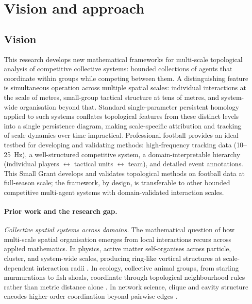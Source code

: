 \section{Vision and approach}

\subsection{Vision}

This research develops new mathematical frameworks for multi-scale topological analysis of competitive collective systems: bounded collections of agents that coordinate within groups while competing between them. A distinguishing feature is simultaneous operation across multiple spatial scales: individual interactions at the scale of metres, small-group tactical structure at tens of metres, and system-wide organisation beyond that. Standard single-parameter persistent homology applied to such systems conflates topological features from these distinct levels into a single persistence diagram, making scale-specific attribution and tracking of scale dynamics over time impractical. Professional football provides an ideal testbed for developing and validating methods: high-frequency tracking data (10--25~Hz), a well-structured competitive system, a domain-interpretable hierarchy (individual players $\leftrightarrow$ tactical units $\leftrightarrow$ team), and detailed event annotations. This Small Grant develops and validates topological methods on football data at full-season scale; the framework, by design, is transferable to other bounded competitive multi-agent systems with domain-validated interaction scales.

\paragraph{Prior work and the research gap.}
\textit{Collective spatial systems across domains.} The mathematical question of how multi-scale spatial organisation emerges from local interactions recurs across applied mathematics. In physics, active matter self-organises across particle, cluster, and system-wide scales, producing ring-like vortical structures at scale-dependent interaction radii \citep{Marchetti2013, Vicsek2012}. In ecology, collective animal groups, from starling murmurations to fish shoals, coordinate through topological neighbourhood rules rather than metric distance alone \citep{Ballerini2008}. In network science, clique and cavity structure encodes higher-order coordination beyond pairwise edges \citep{Giusti2016}.

